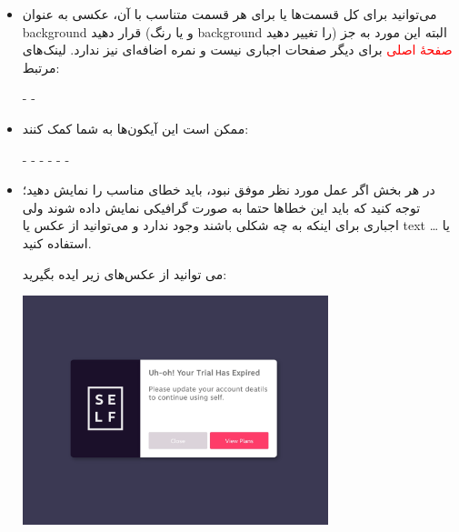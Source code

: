 \documentclass[]{article}
\begin{document}
\begin{itemize}
\item

می‌توانید برای کل قسمت‌ها یا برای هر قسمت متناسب با آن، عکسی به عنوان background قرار دهید (و یا رنگ background را تغییر دهید) البته این مورد به جز
\textcolor{red}{صفحهٔ اصلی}
  برای دیگر صفحات اجباری نیست و نمره اضافه‌ای نیز ندارد. لینک‌های مرتبط:

\href{https://pngtree.com/free-backgrounds}{\textcolor{blue}{\underline{}}} 
-
 \href{https://raw.githubusercontent.com/titansarus/Documents/master/phase_2/main/images/img2.jpg}{\textcolor{blue}{\underline{}}}
 -
  \href{https://github.com/titansarus/Documents/blob/master/phase_2/main/images/img3.jpg}{\textcolor{blue}{\underline{}}} 


\item

ممکن است این آیکون‌ها به شما کمک کنند:

\href{https://gamedeveloperstudio.itch.io/ui-icons}{\textcolor{blue}{\underline{}}}
 -
\href{https://www.kenney.nl/assets/game-icons}{\textcolor{blue}{\underline{}}}
   -
\href{https://www.kenney.nl/assets/ui-pack}{\textcolor{blue}{\underline{}}}
     -
      \href{http://vecteezy.com/vector-art/112447-preloader-ui-progress}{\textcolor{blue}{\underline{}}}
       -
       \href{https://www.vecteezy.com/vector-art/144976-set-of-coupon-sale-vectors}{\textcolor{blue}{\underline{}}}
       -
        \href{https://www.iconninja.com/tag/offer-icon}{\textcolor{blue}{\underline{}}}
         - 
         \href{https://www.iconninja.com/tag/add-icon}{\textcolor{blue}{\underline{}}}

\item

در هر بخش اگر عمل مورد نظر موفق نبود، باید خطای مناسب را نمایش دهید؛ توجه کنید که باید این خطاها حتما به صورت گرافیکی نمایش داده شوند ولی اجباری برای اینکه به چه شکلی باشند وجود ندارد و می‌توانید از عکس یا text یا … استفاده کنید.

می توانید از عکس‌های زیر ایده بگیرید:

\begin{center}
\includegraphics[width=0.7\textwidth]{images/image4.png}
\end{center}


\end{itemize}
\end{document}
